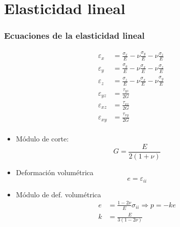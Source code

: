 \documentclass[handout]{beamer}
\begin{document}
\section{Elasticidad lineal}
\begin{frame}
\frametitle{Ecuaciones de la elasticidad lineal}

\parbox{0.3\textwidth}{
\begin{align*}
\varepsilon_x&=\frac{\sigma_x}{E}-\nu \frac{\sigma_y}{E}-\nu \frac{\sigma_z}{E}
\\
\varepsilon_y&=\frac{\sigma_y}{E}-\nu \frac{\sigma_x}{E}-\nu \frac{\sigma_z}{E}
\\
\varepsilon_z&=\frac{\sigma_z}{E}-\nu \frac{\sigma_x}{E}-\nu \frac{\sigma_y}{E}
\\
\varepsilon_{yz}&=\frac{\tau_{yz}}{2G} \\
\varepsilon_{xz}&=\frac{\tau_{xz}}{2G} \\
\varepsilon_{xy}&=\frac{\tau_{xy}}{2G} \\
\end{align*}
}\parbox{0.6\textwidth}{
\begin{itemize}
\item Módulo de corte:
$$
G=\frac{E}{2(1+\nu)}
$$
\item Deformación volumétrica
$$
e=\varepsilon_{ii}
$$
\item Módulo de def. volumétrica
\begin{align*}
e&=\frac{1-2\nu}{E}\sigma_{ii} \Rightarrow p=-k e \\
k&=\frac{E}{3(1-2\nu)}
\end{align*}
\end{itemize}
}
\end{frame}
\end{document}
